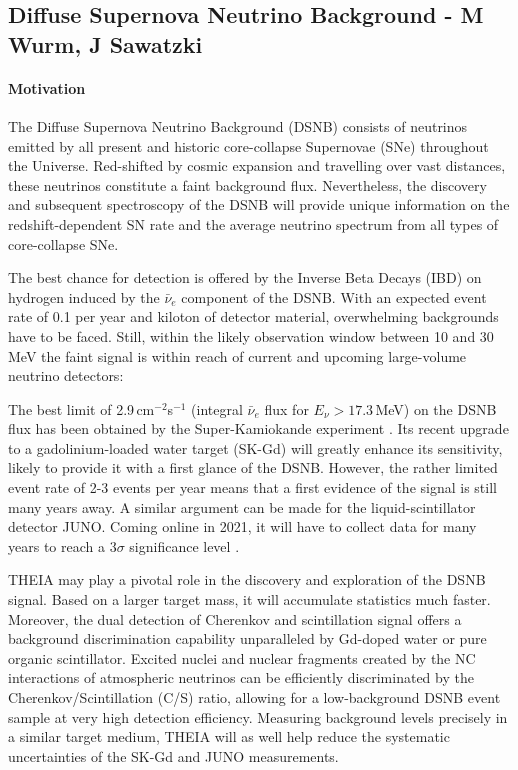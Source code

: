 \subsection{Diffuse Supernova Neutrino Background - M Wurm, J Sawatzki}

\paragraph{Motivation}

The Diffuse Supernova Neutrino Background (DSNB) consists of neutrinos emitted by all present and historic core-collapse Supernovae (SNe) throughout the Universe. Red-shifted by cosmic expansion and travelling over vast distances, these neutrinos constitute a faint background flux. Nevertheless, the discovery and subsequent spectroscopy of the DSNB will provide unique information on the redshift-dependent SN rate and the average neutrino spectrum from all types of core-collapse SNe.

The best chance for detection is offered by the Inverse Beta Decays (IBD) on hydrogen induced by the $\bar\nu_e$ component of the DSNB. With an expected event rate of 0.1 per year and kiloton of detector material, overwhelming backgrounds have to be faced. Still, within the likely observation window between 10 and 30\,MeV the faint signal is within reach of current and upcoming large-volume neutrino detectors:

The best limit of 2.9\,cm$^{-2}$s$^{-1}$ (integral $\bar\nu_e$ flux for $E_\nu>17.3$\,MeV)  on the DSNB flux has been obtained by the Super-Kamiokande experiment \cite{Bays:2011si}. Its recent upgrade to a gadolinium-loaded water target (SK-Gd) will greatly enhance its sensitivity, likely to provide it with a first glance of the DSNB. However, the rather limited event rate of 2-3 events per year means that a first evidence of the signal is still many years away. A similar argument can be made for the liquid-scintillator detector JUNO. Coming online in 2021, it will have to collect data for many years to reach a $3\sigma$ significance level \cite{}.

THEIA may play a pivotal role in the discovery and exploration of the DSNB signal. Based on a larger target mass, it will accumulate statistics much faster. Moreover, the dual detection of Cherenkov and scintillation signal offers a background discrimination capability unparalleled by Gd-doped water or pure organic scintillator. Excited nuclei and nuclear fragments created by the NC interactions of atmospheric neutrinos can be efficiently discriminated by the Cherenkov/Scintillation (C/S) ratio, allowing for a low-background DSNB event sample at very high detection efficiency. Measuring background levels precisely in a similar target medium, THEIA will as well help reduce the systematic uncertainties of the SK-Gd and JUNO measurements.

